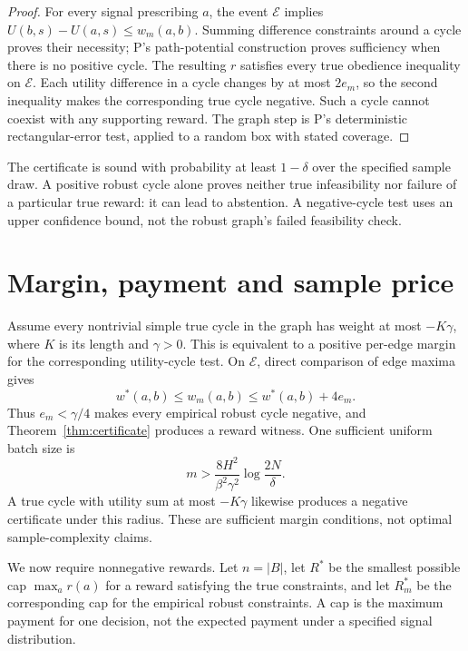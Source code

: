 \documentclass{article}
\begin{document}
\begin{proof}
For every signal prescribing \(a\), the event \(\mathcal E\) implies
\(U(b,s)-U(a,s)\leq w_m(a,b)\). Summing difference constraints around
a cycle proves their necessity; P's path-potential construction proves
sufficiency when there is no positive cycle. The resulting \(r\)
satisfies every true obedience inequality on \(\mathcal E\).
Each utility difference in a cycle changes by at most \(2e_m\), so the
second inequality makes the corresponding true cycle negative. Such a cycle
cannot coexist with any supporting reward. The graph step is P's
deterministic rectangular-error test, applied to a random box with stated
coverage.
\end{proof}

The certificate is sound with probability at least \(1-\delta\) over the
specified sample draw. A positive robust cycle alone proves neither true
infeasibility nor failure of a particular true reward: it can lead to
abstention. A negative-cycle test uses an upper confidence bound, not the
robust graph's failed feasibility check.

\section{Margin, payment and sample price}

Assume every nontrivial simple true cycle in the graph has weight at most
\(-K\gamma\), where \(K\) is its length and \(\gamma>0\). This is
equivalent to a positive per-edge margin for the corresponding utility-cycle
test. On \(\mathcal E\), direct comparison of edge maxima gives
\[
w^*(a,b)\leq w_m(a,b)\leq w^*(a,b)+4e_m.
\]
Thus \(e_m<\gamma/4\) makes every empirical robust cycle negative, and
Theorem~\ref{thm:certificate} produces a reward witness. One sufficient
uniform batch size is
\[
m>\frac{8H^2}{\beta^2\gamma^2}
\log\frac{2N}{\delta}.
\]
A true cycle with utility sum at most \(-K\gamma\) likewise produces a
negative certificate under this radius. These are sufficient margin
conditions, not optimal sample-complexity claims.

We now require nonnegative rewards. Let \(n=|B|\), let \(R^*\) be the
smallest possible cap \(\max_a r(a)\) for a reward satisfying the true
constraints, and let \(R_m^*\) be the corresponding cap for the empirical
robust constraints. A cap is the maximum payment for one decision, not the
expected payment under a specified signal distribution.
\end{document}
